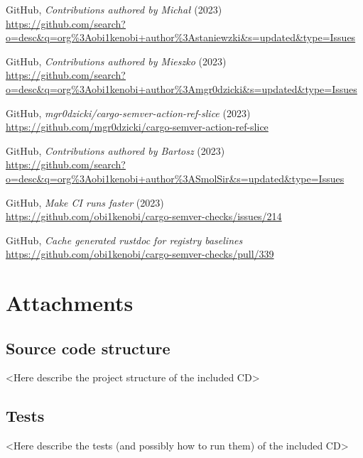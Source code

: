 \documentclass[licencjacka,en]{pracamgr}
\begin{document}
\begin{thebibliography}{99}
 GitHub,
	\textit{Contributions authored by Michał} (2023) \\
	\url{https://github.com/search?o=desc&q=org%3Aobi1kenobi+author%3Astaniewzki&s=updated&type=Issues}

 GitHub,
	\textit{Contributions authored by Mieszko} (2023) \\
	\url{https://github.com/search?o=desc&q=org%3Aobi1kenobi+author%3Amgr0dzicki&s=updated&type=Issues}

 GitHub,
	\textit{mgr0dzicki/cargo-semver-action-ref-slice} (2023) \\
	\url{https://github.com/mgr0dzicki/cargo-semver-action-ref-slice}

 GitHub,
	\textit{Contributions authored by Bartosz} (2023) \\
	\url{https://github.com/search?o=desc&q=org%3Aobi1kenobi+author%3ASmolSir&s=updated&type=Issues}




 GitHub,
	\textit{Make CI runs faster} (2023) \\
	\url{https://github.com/obi1kenobi/cargo-semver-checks/issues/214}

 GitHub,
	\textit{Cache generated rustdoc for registry baselines} \\
	\url{https://github.com/obi1kenobi/cargo-semver-checks/pull/339}

\end{thebibliography}



\chapter*{Attachments}

\section*{Source code structure}

<Here describe the project structure of the included CD>


\section*{Tests}

<Here describe the tests (and possibly how to run them) of the included CD>
\end{document}
